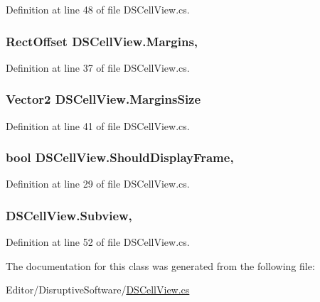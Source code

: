 Definition at line 48 of file D\+S\+Cell\+View.\+cs.

\hypertarget{class_d_s_cell_view_a8c1a26d5f17369dcf7b23995c34cbf57}{
\subsubsection[{Margins}]{\setlength{\rightskip}{0pt plus 5cm}Rect\+Offset D\+S\+Cell\+View.\+Margins\hspace{0.3cm}{\ttfamily [get]}, {\ttfamily [set]}}}\label{class_d_s_cell_view_a8c1a26d5f17369dcf7b23995c34cbf57}


Definition at line 37 of file D\+S\+Cell\+View.\+cs.

\hypertarget{class_d_s_cell_view_a5fc356837c8e03187f2f9da306c7cecb}{
\subsubsection[{Margins\+Size}]{\setlength{\rightskip}{0pt plus 5cm}Vector2 D\+S\+Cell\+View.\+Margins\+Size\hspace{0.3cm}{\ttfamily [get]}}}\label{class_d_s_cell_view_a5fc356837c8e03187f2f9da306c7cecb}


Definition at line 41 of file D\+S\+Cell\+View.\+cs.

\hypertarget{class_d_s_cell_view_a5b6801496214dc1e08fa673a3fd6aa57}{
\subsubsection[{Should\+Display\+Frame}]{\setlength{\rightskip}{0pt plus 5cm}bool D\+S\+Cell\+View.\+Should\+Display\+Frame\hspace{0.3cm}{\ttfamily [get]}, {\ttfamily [set]}}}\label{class_d_s_cell_view_a5b6801496214dc1e08fa673a3fd6aa57}


Definition at line 29 of file D\+S\+Cell\+View.\+cs.

\hypertarget{class_d_s_cell_view_a72bbdadd9c88872bd23bff06ff150cc5}{
\subsubsection[{Subview}]{ D\+S\+Cell\+View.\+Subview\hspace{0.3cm}{\ttfamily [get]}, {\ttfamily [set]}}}\label{class_d_s_cell_view_a72bbdadd9c88872bd23bff06ff150cc5}


Definition at line 52 of file D\+S\+Cell\+View.\+cs.



The documentation for this class was generated from the following file\+:\begin{DoxyCompactItemize}
\item 
Editor/\+Disruptive\+Software/\hyperlink{_d_s_cell_view_8cs}{D\+S\+Cell\+View.\+cs}\end{DoxyCompactItemize}
